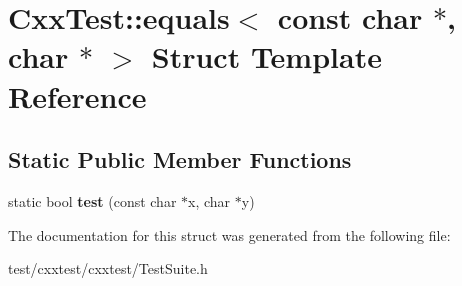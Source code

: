 \hypertarget{structCxxTest_1_1equals_3_01const_01char_01_5_00_01char_01_5_01_4}{\section{Cxx\-Test\-:\-:equals$<$ const char $\ast$, char $\ast$ $>$ Struct Template Reference}
\label{structCxxTest_1_1equals_3_01const_01char_01_5_00_01char_01_5_01_4}
}
\subsection*{Static Public Member Functions}
\begin{DoxyCompactItemize}
\item 
\hypertarget{structCxxTest_1_1equals_3_01const_01char_01_5_00_01char_01_5_01_4_a0ef6cf5c395ca32eb898774f4a1aabe2}{static bool {\bfseries test} (const char $\ast$x, char $\ast$y)}\label{structCxxTest_1_1equals_3_01const_01char_01_5_00_01char_01_5_01_4_a0ef6cf5c395ca32eb898774f4a1aabe2}

\end{DoxyCompactItemize}


The documentation for this struct was generated from the following file\-:\begin{DoxyCompactItemize}
\item 
test/cxxtest/cxxtest/Test\-Suite.\-h\end{DoxyCompactItemize}
